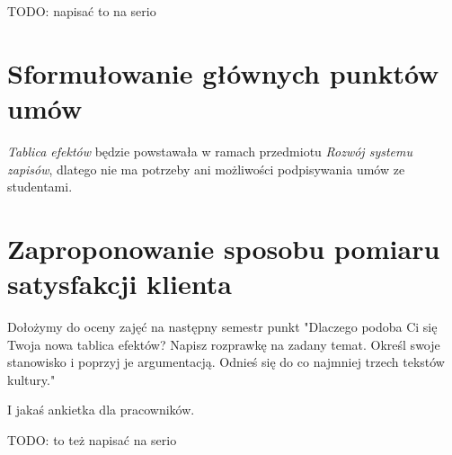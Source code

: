 \documentclass{article}
\begin{document}
TODO: napisać to na serio

\section{Sformułowanie głównych punktów umów}
\textit{Tablica efektów} będzie powstawała w ramach przedmiotu \textit{Rozwój systemu zapisów}, dlatego nie ma potrzeby ani możliwości podpisywania umów ze studentami.

\section{Zaproponowanie sposobu pomiaru satysfakcji klienta}
Dołożymy do oceny zajęć na następny semestr punkt "Dlaczego podoba Ci się Twoja nowa tablica efektów? Napisz rozprawkę na zadany temat. Określ swoje stanowisko i poprzyj je argumentacją. Odnieś się do co najmniej trzech tekstów kultury."

I jakaś ankietka dla pracowników.

TODO: to też napisać na serio
\end{document}

